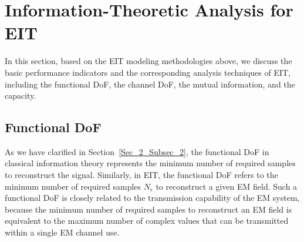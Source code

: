 \documentclass[journal,twocolumn]{IEEEtran}
\begin{document}

\section{Information-Theoretic Analysis for EIT}
In this section, based on the EIT modeling methodologies above, we discuss the basic performance indicators and the corresponding analysis techniques of EIT, including the functional DoF, the channel DoF, the mutual information, and the capacity. 

\vspace{-1em}
\subsection{Functional DoF}\label{Sec_4_Subsec_1}
As we have clarified in Section~\ref{Sec_2_Subsec_2}, the functional DoF in classical information theory represents the minimum number of required samples to reconstruct the signal. Similarly, in EIT, the functional DoF refers to the minimum number of required samples $N_\epsilon$ to reconstruct a given EM field. 
Such a functional DoF is closely related to the transmission capability of the EM system, because the minimum number of required samples to reconstruct an EM field is equivalent to the maximum number of complex values that can be transmitted within a single EM channel use. 
\end{document}
